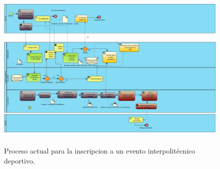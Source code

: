 		\begin{figure}[hbt!]
			\centering
			\includegraphics[width=16cm, height=8cm]{Imagenes/Disenos/ProcesoInscripcionPropuesto.jpg}
			\caption{Proceso actual para la inscripcion a un evento interpolitécnico deportivo.}
			\label{ProcesoInscripcionPropuesto}
		\end{figure}
	\pagebreak
	
